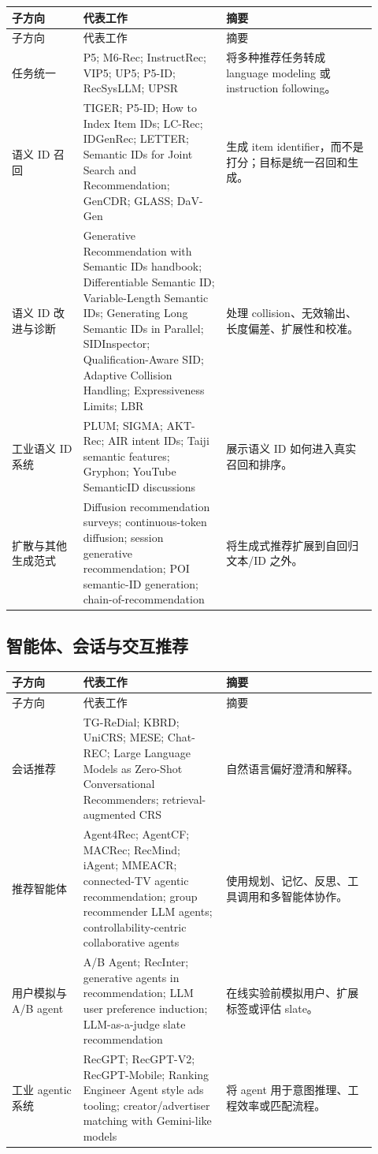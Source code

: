 \documentclass[UTF8,fontset=fandol,11pt]{ctexart}
\begin{document}
\small
\begin{longtable}{@{}p{0.18\linewidth}p{0.36\linewidth}p{0.38\linewidth}@{}}
\toprule
子方向 & 代表工作 & 摘要\\
\midrule
\endfirsthead
\toprule
子方向 & 代表工作 & 摘要\\
\midrule
\endhead
任务统一 & P5; M6-Rec; InstructRec; VIP5; UP5; P5-ID; RecSysLLM; UPSR & 将多种推荐任务转成 language modeling 或 instruction following。\\
语义 ID 召回 & TIGER; P5-ID; How to Index Item IDs; LC-Rec; IDGenRec; LETTER; Semantic IDs for Joint Search and Recommendation; GenCDR; GLASS; DaV-Gen & 生成 item identifier，而不是打分；目标是统一召回和生成。\\
语义 ID 改进与诊断 & Generative Recommendation with Semantic IDs handbook; Differentiable Semantic ID; Variable-Length Semantic IDs; Generating Long Semantic IDs in Parallel; SIDInspector; Qualification-Aware SID; Adaptive Collision Handling; Expressiveness Limits; LBR & 处理 collision、无效输出、长度偏差、扩展性和校准。\\
工业语义 ID 系统 & PLUM; SIGMA; AKT-Rec; AIR intent IDs; Taiji semantic features; Gryphon; YouTube SemanticID discussions & 展示语义 ID 如何进入真实召回和排序。\\
扩散与其他生成范式 & Diffusion recommendation surveys; continuous-token diffusion; session generative recommendation; POI semantic-ID generation; chain-of-recommendation & 将生成式推荐扩展到自回归文本/ID 之外。\\
\bottomrule
\end{longtable}
\normalsize

\subsection{智能体、会话与交互推荐}

\small
\begin{longtable}{@{}p{0.18\linewidth}p{0.36\linewidth}p{0.38\linewidth}@{}}
\toprule
子方向 & 代表工作 & 摘要\\
\midrule
\endfirsthead
\toprule
子方向 & 代表工作 & 摘要\\
\midrule
\endhead
会话推荐 & TG-ReDial; KBRD; UniCRS; MESE; Chat-REC; Large Language Models as Zero-Shot Conversational Recommenders; retrieval-augmented CRS & 自然语言偏好澄清和解释。\\
推荐智能体 & Agent4Rec; AgentCF; MACRec; RecMind; iAgent; MMEACR; connected-TV agentic recommendation; group recommender LLM agents; controllability-centric collaborative agents & 使用规划、记忆、反思、工具调用和多智能体协作。\\
用户模拟与 A/B agent & A/B Agent; RecInter; generative agents in recommendation; LLM user preference induction; LLM-as-a-judge slate recommendation & 在线实验前模拟用户、扩展标签或评估 slate。\\
工业 agentic 系统 & RecGPT; RecGPT-V2; RecGPT-Mobile; Ranking Engineer Agent style ads tooling; creator/advertiser matching with Gemini-like models & 将 agent 用于意图推理、工程效率或匹配流程。\\
\bottomrule
\end{longtable}
\normalsize
\end{document}
